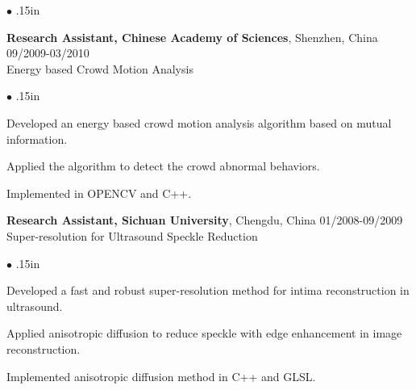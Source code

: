 \documentclass[line,margin]{res}
\newenvironment{bullets}{\begin{list}{\tiny$\bullet$}{\topsep 0pt \itemsep -2pt \leftmargin .15in}}{\vspace*{4pt}\end{list}}
\begin{document}
\begin{resume}
\begin{bullets}
\end{bullets}
\vspace{-.1in}

\textbf{Research Assistant, Chinese Academy of Sciences}, Shenzhen, China   \hfill      09/2009-03/2010 \\ %
Energy based Crowd Motion Analysis
\begin{bullets}
\item Developed an energy based crowd motion analysis algorithm based on mutual information.
\item Applied the algorithm to detect the crowd abnormal behaviors.
\item Implemented in OPENCV and C++.
\end{bullets}
\vspace{-.1in}

\textbf{Research Assistant, Sichuan University}, Chengdu, China \hfill      01/2008-09/2009 \\%
Super-resolution for Ultrasound Speckle Reduction
\begin{bullets}
\item Developed a fast and robust super-resolution method for intima reconstruction in
ultrasound. 
\item Applied anisotropic diffusion to reduce speckle with edge enhancement in image reconstruction.
\item Implemented anisotropic diffusion method in C++ and GLSL.
\end{bullets} %


\end{resume}
\end{document}
